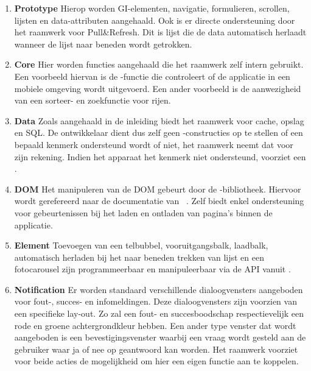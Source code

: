 \begin{enumerate}

\item \textbf{Prototype} 
Hierop worden GI-elementen, navigatie, formulieren, scrollen, lijsten en data-attributen aangehaald.
Ook is er directe ondersteuning door het raamwerk voor Pull\&Refresh.
Dit is lijst die de data automatisch herlaadt wanneer de lijst naar beneden wordt getrokken.

\item \textbf{Core }
Hier worden functies aangehaald die het raamwerk zelf intern gebruikt.
Een voorbeeld hiervan is de -functie die controleert of de applicatie in een mobiele omgeving wordt uitgevoerd.
Een ander voorbeeld is de aanwezigheid van een sorteer- en zoekfunctie voor rijen.

\item \textbf{Data }
Zoals aangehaald in de inleiding biedt het raamwerk  voor cache, opslag en SQL.
De ontwikkelaar dient dus zelf geen -constructies op te stellen of een bepaald kenmerk ondersteund wordt of niet, het raamwerk neemt dat voor zijn rekening.
Indien het apparaat het kenmerk niet ondersteund, voorziet \lungo{} een .

\item \textbf{DOM }
Het manipuleren van de DOM gebeurt door de \quo{}-bibliotheek.
Hiervoor wordt gerefereerd naar de documentatie van \quo{}~\cite{TapQuo2013c}.
Zelf biedt \lungo{} enkel ondersteuning voor gebeurtenissen bij het laden en ontladen van pagina's binnen de applicatie.

\item \textbf{Element }
Toevoegen van een telbubbel, vooruitgangsbalk, laadbalk, automatisch herladen bij het naar beneden trekken van lijst en een fotocarousel zijn programmeerbaar en manipuleerbaar via de \lungo{} API vanuit \js{}. 

\item \textbf{Notification }
Er worden standaard verschillende dialoogvensters aangeboden voor fout-, succes- en infomeldingen.
Deze dialoogvensters zijn voorzien van een specifieke lay-out.
Zo zal een fout- en succesboodschap respectievelijk een rode en groene achtergrondkleur hebben.
Een ander type venster dat wordt aangeboden is een bevestigingsvenster waarbij een vraag wordt gesteld aan de gebruiker waar ja of nee op geantwoord kan worden.
Het raamwerk voorziet voor beide acties de mogelijkheid om hier een eigen functie aan te koppelen.
 

\end{enumerate}
